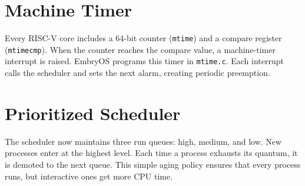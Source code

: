 \begin{figure}[H]
\centering

\end{figure}

\section{Machine Timer}

Every RISC-V core includes a 64-bit counter (\texttt{mtime}) and a compare
register (\texttt{mtimecmp}). When the counter reaches the compare value, a
machine-timer interrupt is raised. EmbryOS programs this timer in
\texttt{mtime.c}. Each interrupt calls the scheduler and sets the next alarm,
creating periodic preemption.

\begin{figure}[H]
\centering

\end{figure}

\begin{figure}[H]
\centering

\end{figure}

\section{Prioritized Scheduler}

The scheduler now maintains three run queues: high, medium, and low. New
processes enter at the highest level. Each time a process exhausts its quantum,
it is demoted to the next queue. This simple aging policy ensures that every
process runs, but interactive ones get more CPU time.

\begin{figure}[H]
\centering

\end{figure}

\begin{figure}[H]
\centering

\end{figure}

